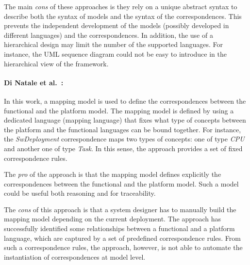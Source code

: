 The main \emph{cons} of these approaches is they rely on a unique abstract syntax to describe both the syntax of models and the syntax of the correspondences. This prevents the independent development of the models (possibly developed in different languages) and the correspondences. In addition, the use of a hierarchical design may limit the number of the supported languages. For instance, the UML sequence diagram could not be easy to introduce in the hierarchical view of the framework.

\paragraph{Di Natale et al.~\cite{dinatale}:}
In this work, a mapping model is used to define the correspondences between the functional and the platform model. The mapping model is defined by using a dedicated language (\ie mapping language) that fixes what type of concepts between the platform and the functional languages can be bound together. For instance, the \emph{SwDeployment} correspondence maps two types of concepts: one of type \emph{CPU} and another one of type \emph{Task}. In this sense, the approach provides a set of fixed correspondence rules. 

The \emph{pro} of the approach is that the mapping model defines explicitly the correspondences between the functional and the platform model. Such a model could be useful both reasoning and for traceability. 

The \emph{cons} of this approach is that a system designer has to manually build the mapping model depending on the current deployment. The approach has successfully identified some relationships between a functional and a platform language, which are captured by a set of predefined correspondence rules. From such a correspondence rules, the approach, however, is not able to automate the instantiation of correspondences at model level. 

